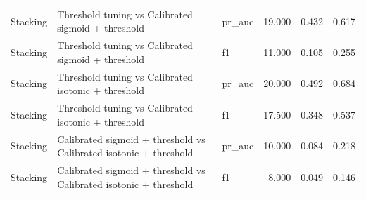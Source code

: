 \begin{tabular}{lllrrr}
Stacking & Threshold tuning vs Calibrated sigmoid + threshold & pr_auc & 19.000 & 0.432 & 0.617 \\
Stacking & Threshold tuning vs Calibrated sigmoid + threshold & f1 & 11.000 & 0.105 & 0.255 \\
Stacking & Threshold tuning vs Calibrated isotonic + threshold & pr_auc & 20.000 & 0.492 & 0.684 \\
Stacking & Threshold tuning vs Calibrated isotonic + threshold & f1 & 17.500 & 0.348 & 0.537 \\
Stacking & Calibrated sigmoid + threshold vs Calibrated isotonic + threshold & pr_auc & 10.000 & 0.084 & 0.218 \\
Stacking & Calibrated sigmoid + threshold vs Calibrated isotonic + threshold & f1 & 8.000 & 0.049 & 0.146 \\
\bottomrule
\end{tabular}
